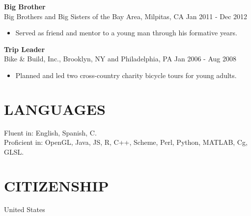 \documentclass[line,margin]{res}
\begin{document}
\begin{resume}
\textbf{Big Brother} \\
Big Brothers and Big Sisters of the Bay Area, Milpitas, CA \hfill Jan 2011 - Dec 2012
\begin{itemize}  \itemsep -2pt %
\item Served as friend and mentor to a young man through his formative years.
\end{itemize}

\textbf{Trip Leader} \\
Bike \& Build, Inc., Brooklyn, NY and Philadelphia, PA \hfill Jan 2006 - Aug 2008
\begin{itemize}  \itemsep -2pt %
\item Planned and led two cross-country charity bicycle tours for young adults.
\end{itemize}


\section{LANGUAGES}
Fluent in: English, Spanish, C.\\
Proficient in: OpenGL, Java, JS, R, C++, Scheme, Perl, Python, MATLAB, Cg, GLSL.

\section{CITIZENSHIP}
United States

\end{resume}
\end{document}
